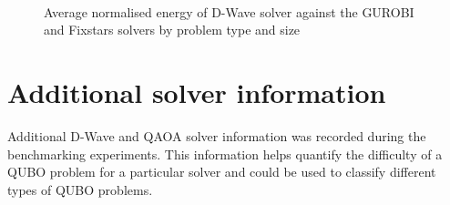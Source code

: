 \begin{figure}[!htb]
    \centering
    \hfill
    \\    
    \caption{Average normalised energy of D-Wave solver against the GUROBI and Fixstars solvers by problem type and size}
    \label{all-time-size}
\end{figure}

\section{Additional solver information}
Additional D-Wave and QAOA solver information was recorded during the benchmarking experiments. This information helps quantify the difficulty of a QUBO problem for a particular solver and could be used to classify different types of QUBO problems.
